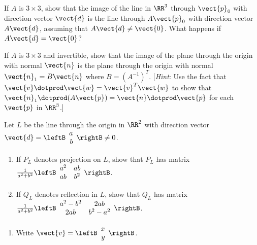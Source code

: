 \begin{multicols}{2}
\begin{ex}
If $A$ is $3 \times 3$, show that the image of the line in $\RR^3$ through $\vect{p}_{0}$ with direction vector $\vect{d}$ is the line through $A\vect{p}_{0}$ with direction vector $A\vect{d}$, assuming that $A\vect{d} \neq \vect{0}$. What happens if $A\vect{d} = \vect{0}$?
\end{ex}

\begin{ex}
If $A$ is $3 \times 3$ and invertible, show that the image of the plane through the origin with normal $\vect{n}$ is the plane through the origin with normal $\vect{n}_{1} = B\vect{n}$ where $B = (A^{-1})^{T}$. [\textit{Hint}: Use the fact that $\vect{v} \dotprod  \vect{w} = \vect{v}^{T}\vect{w}$ to show that $\vect{n}_{1} \dotprod (A\vect{p}) = \vect{n} \dotprod \vect{p}$ for each $\vect{p}$ in $\RR^3$.]
\end{ex}


\begin{ex}
Let $L$ be the line through the origin in $\RR^2$ with direction vector $\vect{d} = \leftB
\begin{array}{r}
a\\
b\\
\end{array}
\rightB \neq 0$.

\begin{enumerate}[label={\alph*.}]
\item If $P_{L}$ denotes projection on $L$, show that $P_{L}$ has matrix $\frac{1}{a^2 + b^2}\leftB
\begin{array}{cc}
a^2 & ab\\
ab & b^2\\
\end{array}\rightB$.

\item If $Q_{L}$ denotes reflection in $L$, show that $Q_{L}$ has matrix $\frac{1}{a^2 + b^2}\leftB
\begin{array}{cc}
a^2 - b^2 & 2ab\\
2ab & b^2 - a^2\\
\end{array}\rightB$.

\end{enumerate}
\begin{sol}
\begin{enumerate}[label={\alph*.}]
\item  Write $\vect{v} = \leftB
\begin{array}{r}
x\\
y
\end{array}
\rightB$.


\end{enumerate}
\end{sol}
\end{ex}
\end{multicols}

